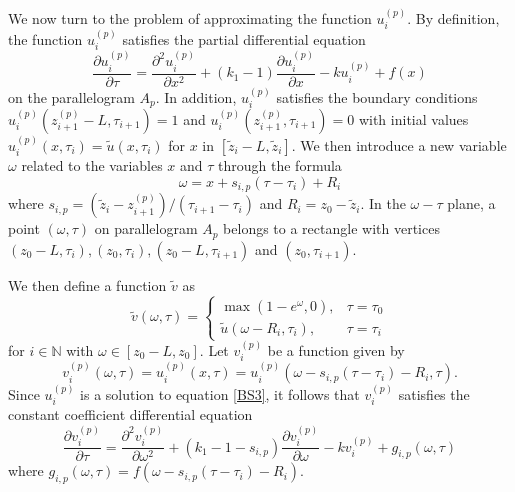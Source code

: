 \documentclass[00main.tex]{subfiles}
\begin{document}
We now turn to the problem of  approximating the function $u_i^{(p)}$. By definition, the function $u_i^{(p)}$ satisfies the partial differential equation 
\begin{equation}
\frac{\partial{u_i^{(p)}}}{\partial \tau} = \frac{\partial^2{u_i^{(p)}}}{\partial x^2} + (k_1-1)\frac{\partial{u_i^{(p)}}}{\partial x} - ku_i^{(p)}  +f(x)
\label{BS3}
\end{equation} on the parallelogram $A_p$. In addition, $u_i^{(p)} $ satisfies the boundary conditions  $u_i^{(p)}(z_{i+1}^{(p)} - L,\tau_{i+1})= 1$ and  $u_i^{(p)}(z_{i+1}^{(p)},\tau_{i+1}) = 0$ with initial values $u_i^{(p)}(x,\tau_i) =  \tilde{u}(x,\tau_i)$ for $x$ in $[\tilde{z}_i-L,\tilde{z}_i]$. We then introduce a new variable $\omega$ related to the variables $x$ and $\tau$ through the formula \[ \omega = x+s_{i,p}(\tau-\tau_i)+ R_i \] where $ s_{i,p}= (\tilde{z}_i-z_{i+1}^{(p)})/(\tau_{i+1}-\tau_i)$ and $R_i = z_0-\tilde{z}_i$. In the $\omega - \tau$ plane, a point $(\omega,\tau)$ on parallelogram $A_p$  belongs to a rectangle with vertices 
$(z_0-L,\tau_i), (z_0,\tau_i), (z_0-L,\tau_{i+1})$ and $(z_0,\tau_{i+1})$. 

We then define a function $\tilde{v}$ as \[ \tilde{v}(\omega,\tau) = \left\lbrace \begin{array}{ll}
\max(1-e^\omega,0), & \tau=\tau_0\\
\tilde{u}(\omega-R_i,\tau_i), & \tau = \tau_i
\end{array} \right. \] for $i\in \mathbb{N}$ with $\omega \in [z_0-L,z_0]$. 
Let $v_i^{(p)}$ be a function given by  \[v_i^{(p)}(\omega,\tau)=u_i^{(p)}(x,\tau)=u_i^{(p)}(\omega-s_{i,p}(\tau-\tau_i)-R_i,\tau).\] Since $u_i^{(p)}$ is a solution to  equation \eqref{BS3}, it follows that $v_i^{(p)}$ satisfies the constant coefficient differential equation \begin{equation}
\frac{\partial{v_i^{(p)}}}{\partial \tau} = \frac{\partial^2{v_i^{(p)}}}{\partial \omega^2} + (k_1-1-s_{i,p})\frac{\partial{v_i^{(p)}}}{\partial \omega} - kv_i^{(p)}  + g_{i,p}(\omega,\tau)
\label{BS4}
\end{equation} where $g_{i,p}(\omega,\tau)=f(\omega-s_{i,p}(\tau-\tau_i) -  R_i)$.
\end{document}
